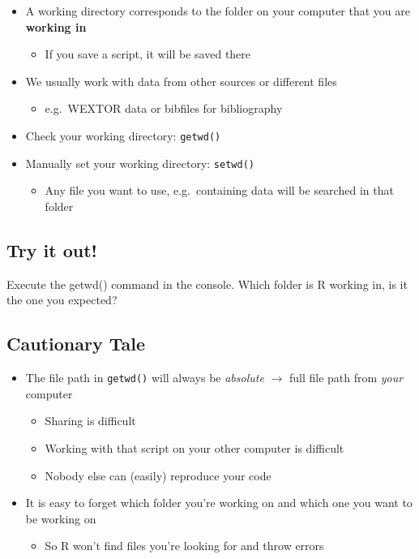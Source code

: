 \documentclass[
]{book}
\providecommand{\tightlist}{%
  \setlength{\itemsep}{0pt}\setlength{\parskip}{0pt}}
\begin{document}
\begin{itemize}
\tightlist
\item
  A working directory corresponds to the folder on your computer that you are \textbf{working in}

  \begin{itemize}
  \tightlist
  \item
    If you save a script, it will be saved there
  \end{itemize}
\item
  We usually work with data from other sources or different files

  \begin{itemize}
  \tightlist
  \item
    e.g.~WEXTOR data or bibfiles for bibliography
  \end{itemize}
\item
  Check your working directory: \texttt{getwd()}
\item
  Manually set your working directory: \texttt{setwd()}

  \begin{itemize}
  \tightlist
  \item
    Any file you want to use, e.g.~containing data will be searched in that folder
  \end{itemize}
\end{itemize}

\subsection{Try it out!}\label{try-it-out}

Execute the getwd() command in the console.
Which folder is R working in, is it the one you expected?

\subsection{Cautionary Tale}\label{cautionary-tale}

\begin{itemize}
\tightlist
\item
  The file path in \texttt{getwd()} will always be \emph{absolute} \(\rightarrow\) full file path from \emph{your} computer

  \begin{itemize}
  \tightlist
  \item
    Sharing is difficult
  \item
    Working with that script on your other computer is difficult
  \item
    Nobody else can (easily) reproduce your code
  \end{itemize}
\item
  It is easy to forget which folder you're working on and which one you want to be working on

  \begin{itemize}
  \tightlist
  \item
    So R won't find files you're looking for and throw errors
  \end{itemize}
\end{itemize}
\end{document}
